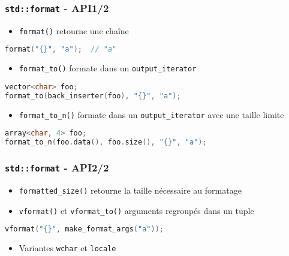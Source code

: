 \documentclass[C++.tex]{subfiles}
\begin{document}
\begin{frame}[fragile]
	\frametitle{\lstinline|std::format| - API\titlehfill{}1/2}
	\begin{itemize}
		\item \lstinline|format()| retourne une chaîne
	\end{itemize}

	\begin{lstlisting}[language=C++]
format("{}", "a"); 	// "a"\end{lstlisting}

	\begin{itemize}
		\item \lstinline|format_to()| formate dans un \lstinline|output_iterator|
	\end{itemize}

	\begin{lstlisting}[language=C++]
vector<char> foo;
format_to(back_inserter(foo), "{}", "a");\end{lstlisting}


	\begin{itemize}
		\item \lstinline|format_to_n()| formate dans un \lstinline|output_iterator| avec une taille limite
	\end{itemize}

	\begin{lstlisting}[language=C++]
array<char, 4> foo;
format_to_n(foo.data(), foo.size(), "{}", "a");\end{lstlisting}

\end{frame}

\begin{frame}[fragile]
	\frametitle{\lstinline|std::format| - API\titlehfill{}2/2}
	\begin{itemize}
		\item \lstinline|formatted_size()| retourne la taille nécessaire au formatage
		\item \lstinline|vformat()| et \lstinline|vformat_to()| arguments regroupés dans un \og tuple\fg{}
	\end{itemize}

	\begin{lstlisting}[language=C++]
vformat("{}", make_format_args("a"));\end{lstlisting}

	\begin{itemize}
		\item Variantes \lstinline|wchar| et \lstinline|locale|
	\end{itemize}
\end{frame}
\end{document}
